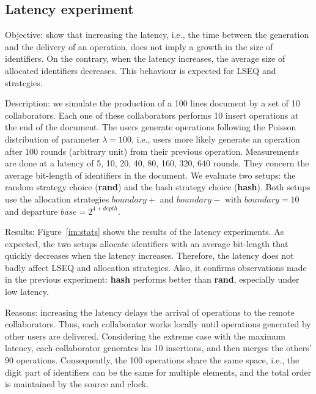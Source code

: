 \subsection{Latency experiment}
\begin{asparadesc}
\item[Objective:] show that increasing the latency, i.e., the time between the
  generation and the delivery of an operation, does not imply a growth in the
  size of identifiers. On the contrary, when the latency increases, the average
  size of allocated identifiers decreases. This behaviour is expected for LSEQ
  and \NAME{} strategies.
\item[Description:] we simulate the production of a 100 lines document by a set
  of 10 collaborators. Each one of these collaborators performs 10 insert
  operations at the end of the document. The users generate operations
  following the Poisson distribution of parameter $\lambda=100$, i.e., users
  more likely generate an operation after 100 rounds (arbitrary unit) from
  their previous operation. Measurements are done at a latency of 5, 10, 20,
  40, 80, 160, 320, 640 rounds. They concern the average bit-length of
  identifiers in the document.  We evaluate two setups: the random strategy
  choice (\textbf{rand}) and the hash strategy choice (\textbf{hash}). Both
  setups use the allocation strategies $boundary+$ and $boundary-$ with
  $boundary=10$ and departure $base=2^{4+depth}$.
\item[Results:] Figure~\ref{im:stats} shows the results of the latency
  experiments. As expected, the two setups allocate identifiers with an average
  bit-length that quickly decreases when the latency increases. Therefore, the
  latency does not badly affect LSEQ and \NAME{} allocation strategies. Also,
  it confirms observations made in the previous experiment: \textbf{hash}
  performs better than \textbf{rand}, especially under low latency.
\item[Reasons:] increasing the latency delays the arrival of operations to the
  remote collaborators. Thus, each collaborator works locally until operations
  generated by other users are delivered. Considering the extreme case with the
  maximum latency, each collaborator generates his 10 insertions, and then
  merges the others' 90 operations. Consequently, the 100 operations share the
  same space, i.e., the digit part of identifiers can be the same for multiple
  elements, and the total order is maintained by the source and clock.
\end{asparadesc}


